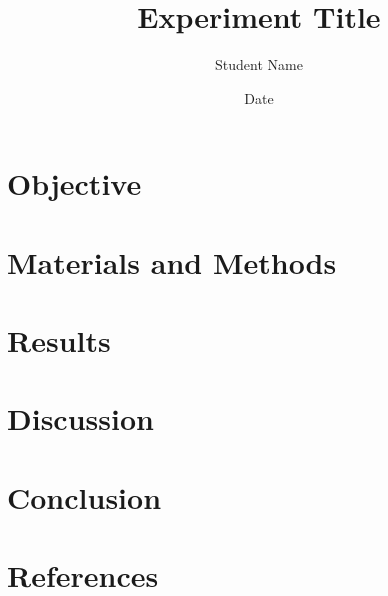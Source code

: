 \documentclass[12pt]{article}
\begin{document}
\title{Experiment Title}
\author{Student Name}
\date{Date}
\maketitle

\section{Objective}

\section{Materials and Methods}

\section{Results}

\section{Discussion}

\section{Conclusion}

\section{References}
\end{document}
